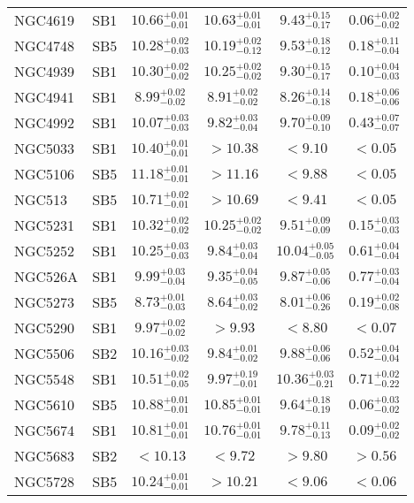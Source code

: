\documentclass[onecolumn]{mn2e}
\begin{document}
{\begin{center}
\begin{longtable}{lccccc}
NGC4619 & SB1 & $10.66_{-0.01}^{+0.01}$ & $10.63_{-0.01}^{+0.01}$ & $9.43_{-0.17}^{+0.15}$ &$0.06_{-0.02}^{+0.02}$ \\
NGC4748 & SB5 & $10.28_{-0.03}^{+0.02}$ & $10.19_{-0.12}^{+0.02}$ & $9.53_{-0.12}^{+0.18}$ &$0.18_{-0.04}^{+0.11}$ \\
NGC4939 & SB1 & $10.30_{-0.02}^{+0.02}$ & $10.25_{-0.02}^{+0.02}$ & $9.30_{-0.17}^{+0.15}$ &$0.10_{-0.03}^{+0.04}$ \\
NGC4941 & SB1 & $8.99_{-0.02}^{+0.02}$ & $8.91_{-0.02}^{+0.02}$ & $8.26_{-0.18}^{+0.14}$ &$0.18_{-0.06}^{+0.06}$ \\
NGC4992 & SB1 & $10.07_{-0.03}^{+0.03}$ & $9.82_{-0.04}^{+0.03}$ & $9.70_{-0.10}^{+0.09}$ &$0.43_{-0.07}^{+0.07}$ \\
NGC5033 & SB1 & $10.40_{-0.01}^{+0.01}$ & $>10.38$ & $<9.10$ &$<0.05$ \\
NGC5106 & SB5 & $11.18_{-0.01}^{+0.01}$ & $>11.16$ & $<9.88$ &$<0.05$ \\
NGC513 & SB5 & $10.71_{-0.01}^{+0.02}$ & $>10.69$ & $<9.41$ &$<0.05$ \\
NGC5231 & SB1 & $10.32_{-0.02}^{+0.02}$ & $10.25_{-0.02}^{+0.02}$ & $9.51_{-0.09}^{+0.09}$ &$0.15_{-0.03}^{+0.03}$ \\
NGC5252 & SB1 & $10.25_{-0.03}^{+0.03}$ & $9.84_{-0.04}^{+0.03}$ & $10.04_{-0.05}^{+0.05}$ &$0.61_{-0.04}^{+0.04}$ \\
NGC526A & SB1 & $9.99_{-0.04}^{+0.03}$ & $9.35_{-0.05}^{+0.04}$ & $9.87_{-0.06}^{+0.05}$ &$0.77_{-0.04}^{+0.03}$ \\
NGC5273 & SB5 & $8.73_{-0.03}^{+0.01}$ & $8.64_{-0.02}^{+0.03}$ & $8.01_{-0.26}^{+0.06}$ &$0.19_{-0.08}^{+0.02}$ \\
NGC5290 & SB1 & $9.97_{-0.02}^{+0.02}$ & $>9.93$ & $<8.80$ &$<0.07$ \\
NGC5506 & SB2 & $10.16_{-0.02}^{+0.03}$ & $9.84_{-0.02}^{+0.01}$ & $9.88_{-0.06}^{+0.06}$ &$0.52_{-0.04}^{+0.04}$ \\
NGC5548 & SB1 & $10.51_{-0.05}^{+0.02}$ & $9.97_{-0.01}^{+0.19}$ & $10.36_{-0.21}^{+0.03}$ &$0.71_{-0.22}^{+0.02}$ \\
NGC5610 & SB5 & $10.88_{-0.01}^{+0.01}$ & $10.85_{-0.01}^{+0.01}$ & $9.64_{-0.19}^{+0.18}$ &$0.06_{-0.02}^{+0.03}$ \\
NGC5674 & SB1 & $10.81_{-0.01}^{+0.01}$ & $10.76_{-0.01}^{+0.01}$ & $9.78_{-0.13}^{+0.11}$ &$0.09_{-0.02}^{+0.02}$ \\
NGC5683 & SB2 & $<10.13$ & $<9.72$ & $>9.80$ &$>0.56$ \\
NGC5728 & SB5 & $10.24_{-0.01}^{+0.01}$ & $>10.21$ & $<9.06$ &$<0.06$ \\

\end{longtable}
\end{center}}
\end{document}
